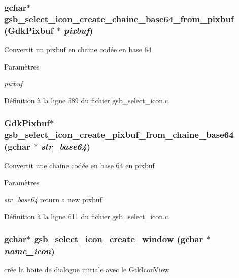 \subsubsection[{gsb\_\-select\_\-icon\_\-create\_\-chaine\_\-base64\_\-from\_\-pixbuf}]{\setlength{\rightskip}{0pt plus 5cm}gchar$\ast$ gsb\_\-select\_\-icon\_\-create\_\-chaine\_\-base64\_\-from\_\-pixbuf (GdkPixbuf $\ast$ {\em pixbuf})}\label{gsb__select__icon_8h_a0821d91b9c32c62c3d2adb1b19d2a02c}
Convertit un pixbuf en chaine codée en base 64


\begin{DoxyParams}{Paramètres}
\item[{\em pixbuf}]\end{DoxyParams}


Définition à la ligne 589 du fichier gsb\_\-select\_\-icon.c.

\subsubsection[{gsb\_\-select\_\-icon\_\-create\_\-pixbuf\_\-from\_\-chaine\_\-base64}]{\setlength{\rightskip}{0pt plus 5cm}GdkPixbuf$\ast$ gsb\_\-select\_\-icon\_\-create\_\-pixbuf\_\-from\_\-chaine\_\-base64 (gchar $\ast$ {\em str\_\-base64})}\label{gsb__select__icon_8h_a8a86f51d893c834b23e3278352f38944}
Convertit une chaine codée en base 64 en pixbuf


\begin{DoxyParams}{Paramètres}
\item[{\em str\_\-base64}]return a new pixbuf \end{DoxyParams}


Définition à la ligne 611 du fichier gsb\_\-select\_\-icon.c.

\subsubsection[{gsb\_\-select\_\-icon\_\-create\_\-window}]{\setlength{\rightskip}{0pt plus 5cm}gchar$\ast$ gsb\_\-select\_\-icon\_\-create\_\-window (gchar $\ast$ {\em name\_\-icon})}\label{gsb__select__icon_8h_a3410f756e299bed53996d17440ebf115}
crée la boite de dialogue initiale avec le GtkIconView


